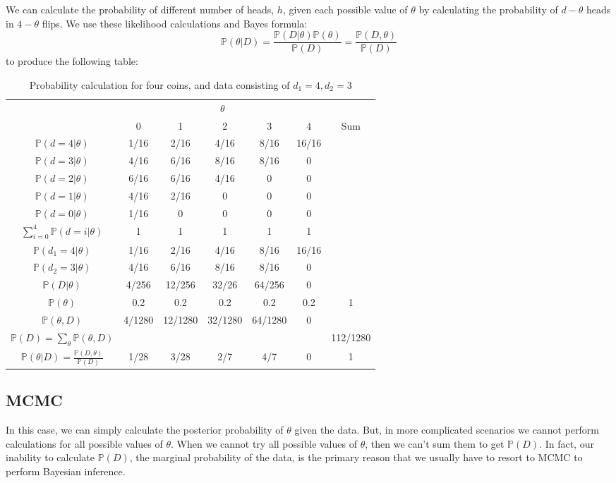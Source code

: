\documentclass[11pt]{article}
\renewcommand{\Pr}{{\mathbb P}}
\begin{document}
We can calculate the probability of different number of heads, $h$, given each possible value of $\theta$ by calculating the probability of $d-\theta$ heads in $4-\theta$ flips.
We use these likelihood calculations and Bayes formula:
$$ \Pr(\theta|D) = \frac{\Pr(D|\theta)\Pr(\theta)}{\Pr(D)}= \frac{\Pr(D,\theta)}{\Pr(D)}$$ 
to produce the following table:
\begin{table}[htdp]
\begin{center}
\begin{tabular}{|c|c|c|c|c|c|c|}
\hline
& \multicolumn{5}{c|}{$\theta$} &\\
& 0 & 1 & 2 & 3 & 4 & Sum\\
\hline
$\Pr(d=4|\theta)$ & 1/16 & 2/16 & 4/16 & 8/16 & 16/16 & \\
$\Pr(d=3|\theta)$ & 4/16 & 6/16 & 8/16 & 8/16 & 0 & \\
$\Pr(d=2|\theta)$ & 6/16 & 6/16 & 4/16 & 0 & 0 & \\
$\Pr(d=1|\theta)$ & 4/16 & 2/16 & 0 & 0 & 0 & \\
$\Pr(d=0|\theta)$ & 1/16 & 0 & 0 & 0 & 0 & \\
\hline
$\sum_{i=0}^4 \Pr(d=i|\theta)$ & 1 & 1 & 1 & 1 & 1 & \\
\hline
$\Pr(d_1=4|\theta)$ & 1/16 & 2/16 & 4/16 & 8/16 & 16/16 & \\
$\Pr(d_2=3|\theta)$ & 4/16 & 6/16 & 8/16 & 8/16 & 0 & \\
$\Pr(D|\theta)$  & 4/256 & 12/256 & 32/26 & 64/256 & 0 & \\
\hline
$\Pr(\theta)$ & 0.2 & 0.2 & 0.2 & 0.2 & 0.2 & 1\\ 
\hline
$\Pr(\theta,D)$  & 4/1280 & 12/1280 & 32/1280 & 64/1280 & 0 & \\
$\Pr(D) =\sum_{\theta}\Pr(\theta,D)$ & & & & & & 112/1280 \\
\hline
$\Pr(\theta|D) = \frac{\Pr(D,\theta)}{\Pr(D)}$ & 1/28 & 3/28 & 2/7 & 4/7 & 0 & 1\\
\hline
\end{tabular}
\end{center}
\caption{Probability calculation for four coins, and data consisting of $d_1=4, d_2=3$}\label{tableCoinProbs}
\end{table}

\subsection*{MCMC}
In this case, we can simply calculate the posterior probability of $\theta$ given the data.  
But, in more complicated scenarios we cannot perform calculations for all possible values of $\theta$.
When we cannot try all possible values of $\theta$, then we can't sum them to get $\Pr(D)$.
In fact, our inability to calculate $\Pr(D)$, the marginal probability of the data, is the primary reason that we usually have to resort to MCMC to perform Bayesian inference.
\end{document}
